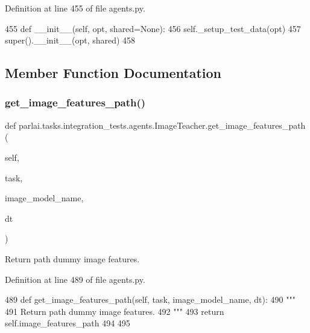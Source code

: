 Definition at line 455 of file agents.\+py.


\begin{DoxyCode}
455     \textcolor{keyword}{def }\_\_init\_\_(self, opt, shared=None):
456         self.\_setup\_test\_data(opt)
457         super().\_\_init\_\_(opt, shared)
458 
\end{DoxyCode}


\subsection{Member Function Documentation}
\mbox{\label{classparlai_1_1tasks_1_1integration__tests_1_1agents_1_1ImageTeacher_a73c89a1d9f05891ad2a749c81814b93e}} 
\subsubsection{\texorpdfstring{get\+\_\+image\+\_\+features\+\_\+path()}{get\_image\_features\_path()}}
{\footnotesize\ttfamily def parlai.\+tasks.\+integration\+\_\+tests.\+agents.\+Image\+Teacher.\+get\+\_\+image\+\_\+features\+\_\+path (\begin{DoxyParamCaption}\item[{}]{self,  }\item[{}]{task,  }\item[{}]{image\+\_\+model\+\_\+name,  }\item[{}]{dt }\end{DoxyParamCaption})}

\begin{DoxyVerb}Return path dummy image features.
\end{DoxyVerb}
 

Definition at line 489 of file agents.\+py.


\begin{DoxyCode}
489     \textcolor{keyword}{def }get\_image\_features\_path(self, task, image\_model\_name, dt):
490         \textcolor{stringliteral}{"""}
491 \textcolor{stringliteral}{        Return path dummy image features.}
492 \textcolor{stringliteral}{        """}
493         \textcolor{keywordflow}{return} self.image\_features\_path
494 
495 
\end{DoxyCode}


